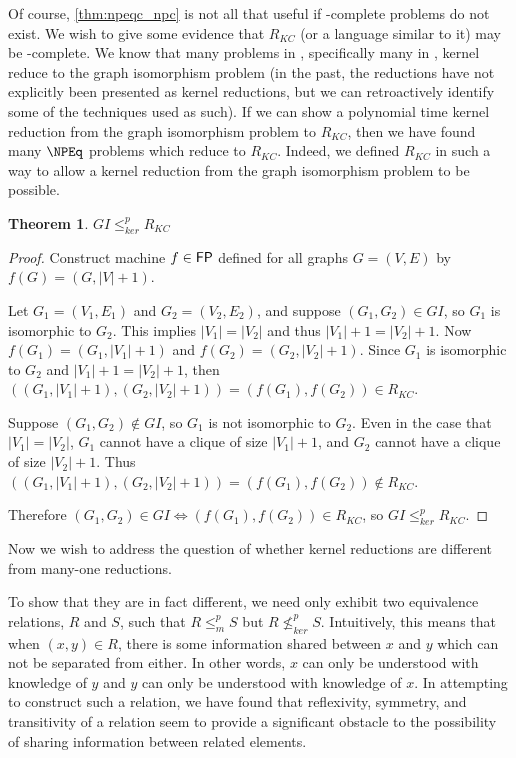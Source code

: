 \documentclass[draft]{article}
\newtheorem{theorem}{Theorem}%
\theoremstyle{definition}
\newcommand{\kr}{\leq^{p}_{ker}} %
\newcommand{\nkr}{\nleq^{p}_{ker}} %
\newcommand{\mor}{\leq^{p}_{m}} %
\begin{document}

Of course, \autoref{thm:npeqc_npc} is not all that useful if \NPEq-complete
problems do not exist. We wish to give some evidence that $R_{KC}$ (or a
language similar to it) may be \NPEq-complete. We know that many problems in
\NP, specifically many in \NPEq, kernel reduce to the graph isomorphism problem
(in the past, the reductions have not explicitly been presented as kernel
reductions, but we can retroactively identify some of the techniques used as
such). If we can show a polynomial time kernel reduction from the graph
isomorphism problem to $R_{KC}$, then we have found many $\NPEq$ problems which
reduce to $R_{KC}$. Indeed, we defined $R_{KC}$ in such a way to allow a kernel
reduction from the graph isomorphism problem to be possible.

\begin{theorem}$GI\kr R_{KC}$\end{theorem}
\begin{proof}
  Construct machine $f\in{\ensuremath{\mathsf{FP}}}$ defined for all graphs $G=(V,E)$ by
  $f(G)=(G,|V|+1)$.

  Let $G_1=(V_1, E_1)$ and $G_2=(V_2, E_2)$, and suppose $(G_1, G_2)\in GI$, so
  $G_1$ is isomorphic to $G_2$. This implies $|V_1|=|V_2|$ and thus
  $|V_1|+1=|V_2|+1$. Now $f(G_1)=(G_1, |V_1|+1)$ and $f(G_2)=(G_2,
  |V_2|+1)$. Since $G_1$ is isomorphic to $G_2$ and $|V_1|+1=|V_2|+1$, then
  $((G_1, |V_1|+1),(G_2, |V_2|+1))=(f(G_1), f(G_2))\in R_{KC}$.
  
  Suppose $(G_1, G_2)\notin GI$, so $G_1$ is not isomorphic to $G_2$. Even in
  the case that $|V_1|=|V_2|$, $G_1$ cannot have a clique of size $|V_1|+1$,
  and $G_2$ cannot have a clique of size $|V_2|+1$. Thus $((G_1, |V_1|+1),
  (G_2, |V_2|+1))=(f(G_1), f(G_2))\notin R_{KC}$.

  Therefore $(G_1, G_2)\in GI\iff (f(G_1), f(G_2))\in R_{KC}$, so $GI\kr
  R_{KC}$.
\end{proof}

Now we wish to address the question of whether kernel reductions are different
from many-one reductions.

To show that they are in fact different, we need only exhibit two equivalence
relations, $R$ and $S$, such that $R\mor S$ but $R\nkr S$. Intuitively, this
means that when $(x,y)\in R$, there is some information shared between $x$ and
$y$ which can not be separated from either. In other words, $x$ can only be
understood with knowledge of $y$ and $y$ can only be understood with knowledge
of $x$. In attempting to construct such a relation, we have found that
reflexivity, symmetry, and transitivity of a relation seem to provide a
significant obstacle to the possibility of sharing information between related
elements.
\end{document}
